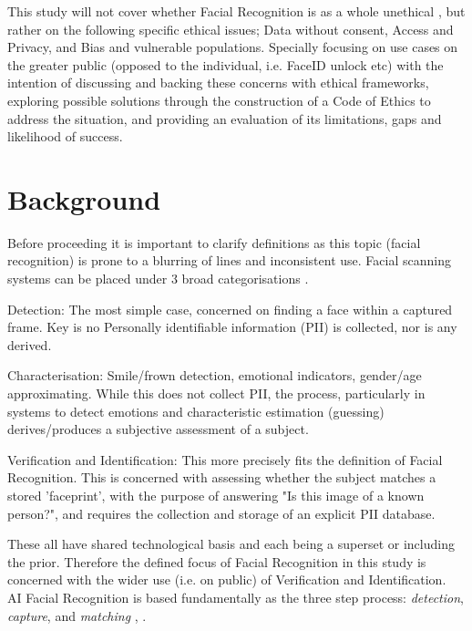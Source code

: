 \documentclass[11pt]{article}
\begin{document}
This study will not cover whether Facial Recognition is as a whole unethical \cite{plutonium}, but rather on the following specific ethical issues; Data without consent, Access and Privacy, and Bias and vulnerable populations. Specially focusing on use cases on the greater public (opposed to the individual, i.e. FaceID unlock etc) with the intention of discussing and backing these concerns with ethical frameworks, exploring possible solutions through the construction of a Code of Ethics to address the situation, and providing an evaluation of its limitations, gaps and likelihood of success.

\section{Background}
Before proceeding it is important to clarify definitions as this topic (facial recognition) is prone to a blurring of lines and inconsistent use. Facial scanning systems can be placed under 3 broad categorisations \cite{ethics_book}.

Detection: The most simple case, concerned on finding a face within a captured frame. Key is no Personally identifiable information (PII) is collected, nor is any derived.

Characterisation: Smile/frown detection, emotional indicators, gender/age approximating. While this does not collect PII, the process, particularly in systems to detect emotions and characteristic estimation (guessing) derives/produces a subjective assessment of a subject.

Verification and Identification: This more precisely fits the definition of Facial Recognition. This is concerned with assessing whether the subject matches a stored 'faceprint', with the purpose of answering "Is this image of a known person?", and requires the collection and storage of an explicit PII database.

These all have shared technological basis \cite{ethics_book} and each being a superset or including the prior. Therefore the defined focus of Facial Recognition in this study is concerned with the wider use (i.e. on public) of Verification and Identification.\\

AI Facial Recognition is based fundamentally as the three step process: \textit{detection}, \textit{capture}, and \textit{matching} \cite{ethics_book}, \cite{thales}.
\end{document}

